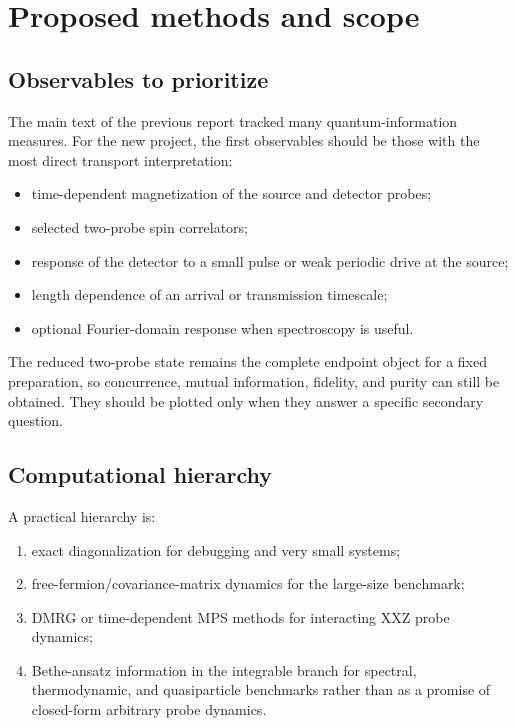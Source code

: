 \documentclass[11pt,a4paper]{article}
\begin{document}
\section{Proposed methods and scope}

\subsection{Observables to prioritize}
The main text of the previous report tracked many quantum-information measures.  For the new project, the first observables should be those with the most direct transport interpretation:
\begin{itemize}[leftmargin=0.8cm]
    \item time-dependent magnetization of the source and detector probes;
    \item selected two-probe spin correlators;
    \item response of the detector to a small pulse or weak periodic drive at the source;
    \item length dependence of an arrival or transmission timescale;
    \item optional Fourier-domain response when spectroscopy is useful.
\end{itemize}

The reduced two-probe state remains the complete endpoint object for a fixed preparation, so concurrence, mutual information, fidelity, and purity can still be obtained.  They should be plotted only when they answer a specific secondary question.

\subsection{Computational hierarchy}
A practical hierarchy is:
\begin{enumerate}[leftmargin=0.9cm]
    \item exact diagonalization for debugging and very small systems;
    \item free-fermion/covariance-matrix dynamics for the large-size benchmark;
    \item DMRG or time-dependent MPS methods for interacting XXZ probe dynamics;
    \item Bethe-ansatz information in the integrable branch for spectral, thermodynamic, and quasiparticle benchmarks rather than as a promise of closed-form arbitrary probe dynamics.
\end{enumerate}
\end{document}
